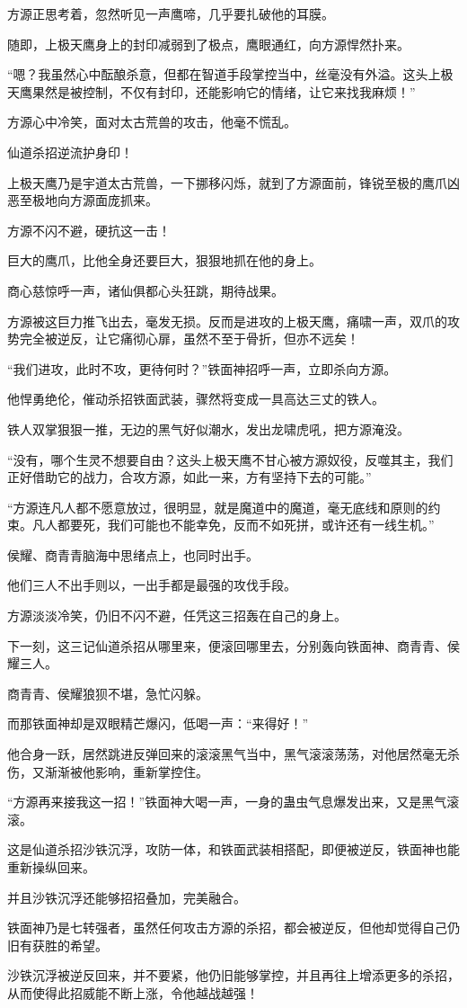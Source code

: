 \begin{this_body}
方源正思考着，忽然听见一声鹰啼，几乎要扎破他的耳膜。

随即，上极天鹰身上的封印减弱到了极点，鹰眼通红，向方源悍然扑来。

“嗯？我虽然心中酝酿杀意，但都在智道手段掌控当中，丝毫没有外溢。这头上极天鹰果然是被控制，不仅有封印，还能影响它的情绪，让它来找我麻烦！”

方源心中冷笑，面对太古荒兽的攻击，他毫不慌乱。

仙道杀招逆流护身印！

上极天鹰乃是宇道太古荒兽，一下挪移闪烁，就到了方源面前，锋锐至极的鹰爪凶恶至极地向方源面庞抓来。

方源不闪不避，硬抗这一击！

巨大的鹰爪，比他全身还要巨大，狠狠地抓在他的身上。

商心慈惊呼一声，诸仙俱都心头狂跳，期待战果。

方源被这巨力推飞出去，毫发无损。反而是进攻的上极天鹰，痛啸一声，双爪的攻势完全被逆反，让它痛彻心扉，虽然不至于骨折，但亦不远矣！

“我们进攻，此时不攻，更待何时？”铁面神招呼一声，立即杀向方源。

他悍勇绝伦，催动杀招铁面武装，骤然将变成一具高达三丈的铁人。

铁人双掌狠狠一推，无边的黑气好似潮水，发出龙啸虎吼，把方源淹没。

“没有，哪个生灵不想要自由？这头上极天鹰不甘心被方源奴役，反噬其主，我们正好借助它的战力，合攻方源，如此一来，方有坚持下去的可能。”

“方源连凡人都不愿意放过，很明显，就是魔道中的魔道，毫无底线和原则的约束。凡人都要死，我们可能也不能幸免，反而不如死拼，或许还有一线生机。”

侯耀、商青青脑海中思绪点上，也同时出手。

他们三人不出手则以，一出手都是最强的攻伐手段。

方源淡淡冷笑，仍旧不闪不避，任凭这三招轰在自己的身上。

下一刻，这三记仙道杀招从哪里来，便滚回哪里去，分别轰向铁面神、商青青、侯耀三人。

商青青、侯耀狼狈不堪，急忙闪躲。

而那铁面神却是双眼精芒爆闪，低喝一声：“来得好！”

他合身一跃，居然跳进反弹回来的滚滚黑气当中，黑气滚滚荡荡，对他居然毫无杀伤，又渐渐被他影响，重新掌控住。

“方源再来接我这一招！”铁面神大喝一声，一身的蛊虫气息爆发出来，又是黑气滚滚。

这是仙道杀招沙铁沉浮，攻防一体，和铁面武装相搭配，即便被逆反，铁面神也能重新操纵回来。

并且沙铁沉浮还能够招招叠加，完美融合。

铁面神乃是七转强者，虽然任何攻击方源的杀招，都会被逆反，但他却觉得自己仍旧有获胜的希望。

沙铁沉浮被逆反回来，并不要紧，他仍旧能够掌控，并且再往上增添更多的杀招，从而使得此招威能不断上涨，令他越战越强！

\end{this_body}

